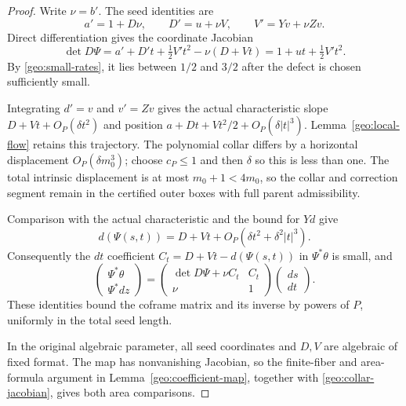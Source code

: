 \documentclass[11pt]{amsart}
\theoremstyle{definition}
\theoremstyle{remark}
\numberwithin{equation}{section}
\begin{document}
\begin{proof}
Write $\nu=b'$. The seed identities are
\[
a'=1+D\nu,\qquad D'=u+\nu V,\qquad V'=Yv+\nu Zv.
\]
Direct differentiation gives the coordinate Jacobian
\begin{equation}\label{geo:collar-jacobian}
\det D\Psi=a'+D't+\tfrac12V't^2-\nu(D+Vt)=1+ut+\tfrac12V't^2.
\end{equation}
By \eqref{geo:small-rates}, it lies between $1/2$ and $3/2$ after the defect is chosen sufficiently small.

Integrating $d'=v$ and $v'=Zv$ gives the actual characteristic slope $D+Vt+O_P(\delta t^2)$ and position $a+Dt+Vt^2/2+O_P(\delta|t|^3)$. Lemma~\ref{geo:local-flow} retains this trajectory. The polynomial collar differs by a horizontal displacement $O_P(\delta m_0^3)$; choose $c_P\le1$ and then $\delta$ so this is less than one. The total intrinsic displacement is at most $m_0+1<4m_0$, so the collar and correction segment remain in the certified outer boxes with full parent admissibility.

Comparison with the actual characteristic and the bound for $Yd$ give
\[
d(\Psi(s,t))=D+Vt+O_P(\delta t^2+\delta^2|t|^3).
\]
Consequently the $dt$ coefficient $C_t=D+Vt-d(\Psi(s,t))$ in $\Psi^*\theta$ is small, and
\[
\begin{pmatrix}\Psi^*\theta\\\Psi^*dz\end{pmatrix}=\begin{pmatrix}\det D\Psi+\nu C_t&C_t\\\nu&1\end{pmatrix}\begin{pmatrix}ds\\dt\end{pmatrix}.
\]
These identities bound the coframe matrix and its inverse by powers of $P$, uniformly in the total seed length.

In the original algebraic parameter, all seed coordinates and $D,V$ are algebraic of fixed format. The map has nonvanishing Jacobian, so the finite-fiber and area-formula argument in Lemma~\ref{geo:coefficient-map}, together with \eqref{geo:collar-jacobian}, gives both area comparisons.
\end{proof}
\end{document}
